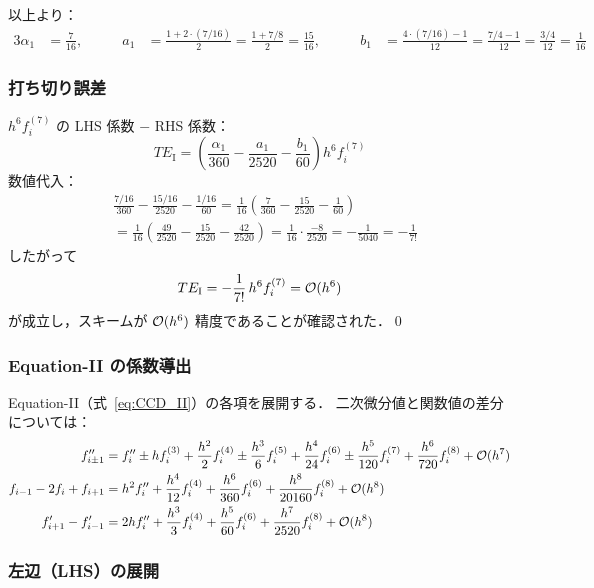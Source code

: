 以上より：
\begin{alignat}{3}
  \alpha_1 &= \frac{7}{16}, \qquad
  &a_1 &= \frac{1+2\cdot(7/16)}{2} = \frac{1 + 7/8}{2} = \frac{15}{16}, \qquad
  &b_1 &= \frac{4\cdot(7/16)-1}{12} = \frac{7/4-1}{12} = \frac{3/4}{12} = \frac{1}{16}
\end{alignat}

\subsubsection*{打ち切り誤差}

$h^6 f^{(7)}_i$ の LHS 係数 $-$ RHS 係数：
\[
  TE_{\mathrm{I}} = \left(\frac{\alpha_1}{360} - \frac{a_1}{2520} - \frac{b_1}{60}\right)h^6 f^{(7)}_i
\]
数値代入：
\begin{align*}
  &\frac{7/16}{360} - \frac{15/16}{2520} - \frac{1/16}{60}
  = \frac{1}{16}\!\left(\frac{7}{360} - \frac{15}{2520} - \frac{1}{60}\right) \\
  &= \frac{1}{16}\!\left(\frac{49}{2520} - \frac{15}{2520} - \frac{42}{2520}\right)
  = \frac{1}{16}\cdot\frac{-8}{2520}
  = -\frac{1}{5040} = -\frac{1}{7!}
\end{align*}
したがって
\[
  TE_{\mathrm{I}} = -\frac{1}{7!}\,h^6 f^{(7)}_i = \mathcal{O}(h^6)
\]
が成立し，スキームが $\mathcal{O}(h^6)$ 精度であることが確認された．\qed

\subsubsection{Equation-II の係数導出}
\label{app:ccd_coef_derivation_II}

Equation-II（式~\eqref{eq:CCD_II}）の各項を展開する．
二次微分値と関数値の差分については：
\begin{align}
  f''_{i\pm1} &= f''_i \pm hf^{(3)}_i + \frac{h^2}{2}f^{(4)}_i \pm \frac{h^3}{6}f^{(5)}_i
                + \frac{h^4}{24}f^{(6)}_i \pm \frac{h^5}{120}f^{(7)}_i
                + \frac{h^6}{720}f^{(8)}_i + \mathcal{O}(h^7) \\
  f_{i-1} - 2f_i + f_{i+1} &= h^2 f''_i + \frac{h^4}{12}f^{(4)}_i
                               + \frac{h^6}{360}f^{(6)}_i
                               + \frac{h^8}{20160}f^{(8)}_i + \mathcal{O}(h^8) \\
  f'_{i+1} - f'_{i-1} &= 2hf''_i + \frac{h^3}{3}f^{(4)}_i
                         + \frac{h^5}{60}f^{(6)}_i
                         + \frac{h^7}{2520}f^{(8)}_i + \mathcal{O}(h^8)
\end{align}

\subsubsection*{左辺（LHS）の展開}

